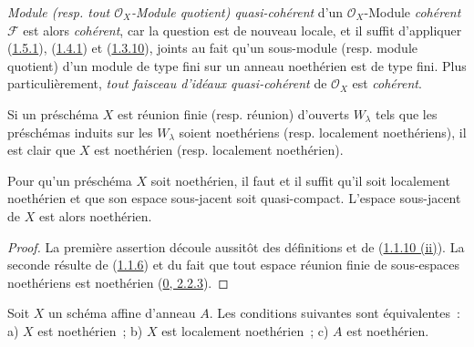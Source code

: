 \emph{Module (resp. tout $\mathscr{O}_X$-Module quotient) quasi-cohérent}
d'un $\mathscr{O}_X$-Module \emph{cohérent} $\mathscr{F}$ est alors
\emph{cohérent}, car la question est de nouveau locale, et il suffit
d'appliquer (\hyperref[I.1.5.1-fr]{1.5.1}),
(\hyperref[I.1.4.1-fr]{1.4.1}) et
(\hyperref[I.1.3.10-fr]{1.3.10}), joints au fait qu'un sous-module (resp.
module quotient) d'un module de type fini sur un anneau noethérien est de
type fini. Plus particulièrement, \emph{tout faisceau d'idéaux
quasi-cohérent} de $\mathscr{O}_X$ est \emph{cohérent}.

Si un préschéma $X$ est réunion finie (resp. réunion) d'ouverts $W_\lambda$
tels que les préschémas induits sur les $W_\lambda$ soient noethériens (resp.
localement noethériens), il est clair que $X$ est noethérien (resp.
localement noethérien).

\begin{proposition}[6.1.2]
\label{I.6.1.2-fr}
Pour qu'un préschéma $X$ soit noethérien, il faut et il suffit qu'il soit
localement noethérien et que son espace sous-jacent soit quasi-compact.
L'espace sous-jacent de $X$ est alors noethérien.
\end{proposition}

\begin{proof}
La première assertion découle aussitôt des définitions et de
(\hyperref[I.1.1.10-fr]{1.1.10 (ii)}). La seconde résulte de
(\hyperref[I.1.1.6-fr]{1.1.6}) et du fait que tout espace réunion finie de
sous-espaces noethériens est noethérien
(\hyperref[0.2.2.3-fr]{0, 2.2.3}).
\end{proof}

\begin{proposition}[6.1.3]
\label{I.6.1.3-fr}
Soit $X$ un schéma affine d'anneau $A$. Les conditions suivantes sont
équivalentes~: a) $X$ est noethérien~; b) $X$ est localement noethérien~;
c) $A$ est noethérien.
\end{proposition}

